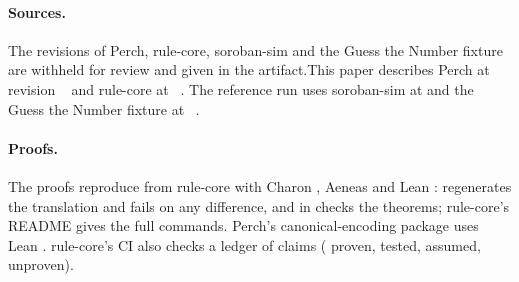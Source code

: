 
\paragraph{Sources.} \ifdefined\anonymous The revisions of Perch, rule-core,
soroban-sim and the Guess the Number fixture are withheld for review and given in
the artifact.\else This paper describes Perch at revision
~ and rule-core at
~. The reference run uses soroban-sim
at  and the Guess the Number fixture at
~.\fi

\paragraph{Proofs.} The proofs reproduce from rule-core with Charon
, Aeneas  and Lean :
 regenerates the translation and fails on any
difference, and  in  checks the theorems;
rule-core's README gives the full commands. Perch's canonical-encoding package
uses Lean . rule-core's CI also checks a ledger of
 claims ( proven, 
tested,  assumed,  unproven).

